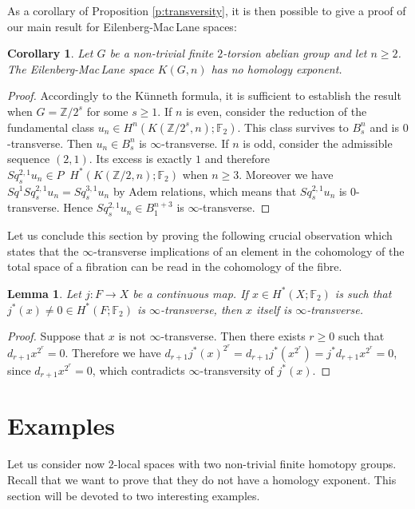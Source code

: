 \documentclass{conm-p-l}
\newtheorem{lem}[thm]{Lemma}
\newtheorem{cor}[thm]{Corollary}
\theoremstyle{definition}
\DeclareMathOperator{\even}{^{even}}
\newcommand{\Z}{\mathbb{Z}}
\newcommand{\F}{\mathbb{F}}
\renewcommand{\geq}{\geqslant}
\begin{document}
As a corollary of Proposition \ref{p:transversity}, it is then possible to give a proof of our main result for Eilenberg-Mac\,Lane spaces:

\begin{cor}\label{c:GEM_no_exp}
Let $G$ be a non-trivial finite $2$-torsion abelian group and let \mbox{$n\geq2$}. The Eilenberg-Mac\,Lane space $K(G,n)$ has no homology exponent.
\end{cor}

\begin{proof}
Accordingly to the K\"unneth formula, it is sufficient to establish the result when $G=\Z/2^s$ for some $s\geq1$. If $n$ is even, consider the reduction of the fundamental class $u_n\in H^n(K(\Z/2^s,n);\F_2)$. This class survives to $B^n_s$ and is $0$-transverse. Then $u_n\in B^n_s$ is $\infty$-transverse. If $n$ is odd, consider the admissible sequence $(2,1)$. Its excess is exactly $1$ and therefore $Sq^{2,1}_s u_n\in P\even H^*(K(\Z/2,n);\F_2)$ when $n\geq3$. Moreover we have $Sq^1Sq^{2,1}_s u_n=Sq^{3,1}_s u_n$ by Adem relations, which means that $Sq^{2,1}_s u_n$ is $0$-transverse. Hence $Sq^{2,1}_s u_n\in B^{n+3}_1$ is $\infty$-transverse.
\end{proof}

Let us conclude this section by proving the following crucial observation which states that the $\infty$-transverse implications of an element in the cohomology of the total space of a fibration can be read in the cohomology of the fibre. 

\begin{lem}
Let $j:F\to X$ be a continuous map. If $x\in H^*(X;\F_2)$ is such that $j^*(x)\not=0\in H^*(F;\F_2)$ is $\infty$-transverse, then $x$ itself is $\infty$-transverse.
\end{lem}

\begin{proof}
Suppose that $x$ is not $\infty$-transverse. Then there exists $r\geq0$ such that $d_{r+1}x^{2^r}=0$. Therefore we have $d_{r+1}j^*(x)^{2^r}=d_{r+1}j^*(x^{2^r})=j^*d_{r+1}x^{2^r}=0$, since $d_{r+1}x^{2^r}=0$, which contradicts $\infty$-transversity of $j^*(x)$.
\end{proof}

\section{Examples}\label{s:examples}

Let us consider now $2$-local spaces with two non-trivial finite homotopy groups. Recall that we want to prove that they do not have a homology exponent. This section will be devoted to two interesting examples. 
\end{document}
